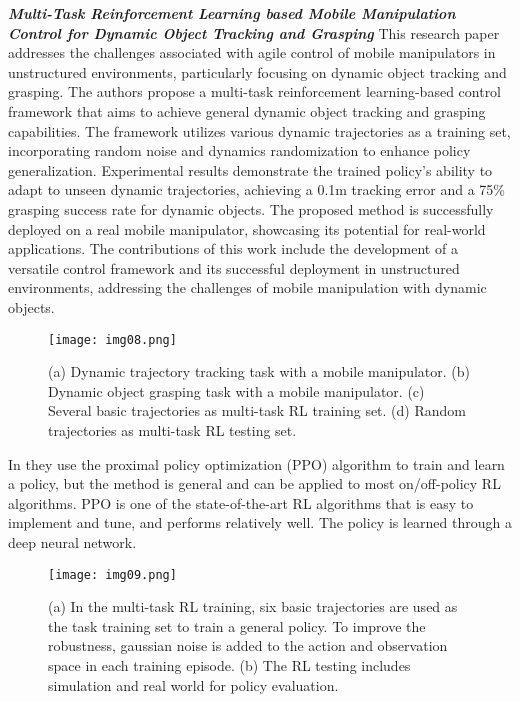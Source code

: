 \textbf{\textit{Multi-Task Reinforcement Learning based Mobile Manipulation Control for Dynamic Object Tracking and Grasping}} \quad
This research paper \cite{wang2022multitask} addresses the challenges associated with
agile control of mobile manipulators in unstructured environments, particularly focusing
on dynamic object tracking and grasping. The authors propose a multi-task reinforcement
learning-based control framework that aims to achieve general dynamic object tracking and
grasping capabilities. The framework utilizes various dynamic trajectories as a training set,
incorporating random noise and dynamics randomization to enhance policy generalization.
Experimental results demonstrate the trained policy's ability to adapt to unseen dynamic
trajectories, achieving a 0.1m tracking error and a 75\% grasping success rate for dynamic objects.
The proposed method is successfully deployed on a real mobile manipulator, showcasing its
potential for real-world applications. The contributions of this work include the development
of a versatile control framework and its successful deployment in unstructured environments,
addressing the challenges of mobile manipulation with dynamic objects.

\begin{figure}[H]
	\centering
	\texttt{[image: img08.png]}
	\captionsetup{width=1\linewidth}
	\caption{(a) Dynamic trajectory tracking task with a mobile manipulator. (b)
	Dynamic object grasping task with a mobile manipulator. (c) Several basic
	trajectories as multi-task RL training set. (d) Random trajectories as multi-task
	RL testing set.\cite{wang2022multitask}}
	\label{fig:img08}
\end{figure}

In \cite{wang2022multitask} they use the proximal policy optimization (PPO) algorithm to train 
and learn a policy, but the method is general and can be applied to most on/off-policy RL algorithms.
PPO is one of the state-of-the-art RL algorithms that is easy to implement and tune, and performs
relatively well. The policy is learned through a deep neural network.

\begin{figure}[H]
	\centering
	\texttt{[image: img09.png]}
	\captionsetup{width=1\linewidth}
	\caption{(a) In the multi-task RL training, six basic trajectories are used as the task
	training set to train a general policy. To improve the robustness, gaussian noise is added
	to the action and observation space in each training episode. (b) The RL testing includes
	simulation and real world for policy evaluation.\cite{wang2022multitask}}
	\label{fig:img09}
\end{figure}

